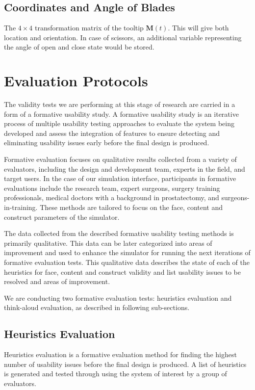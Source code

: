 \subsection{Coordinates and Angle of Blades}\label{para:data_coordinates_of_blades}

The $4\times 4$ transformation matrix of the tooltip $\mathbf{M}(t)$. This will give both location and orientation. In case of scissors, an additional variable representing the angle of open and close state would be stored.

\section{Evaluation Protocols}\label{sec:evaluation}

The validity tests we are performing at this stage of research are carried in a form of a formative usability study. A formative usability study is an iterative process of multiple usability testing approaches to evaluate the system being developed and assess the integration of features to ensure detecting and eliminating usability issues early before the final design is produced.

Formative evaluation focuses on qualitative results collected from a variety of evaluators, including the design and development team, experts in the field, and target users. In the case of our simulation interface, participants in formative evaluations include the research team, expert surgeons, surgery training professionals, medical doctors with a background in prostatectomy, and surgeons-in-training. These methods are tailored to focus on the face, content and construct parameters of the simulator.

The data collected from the described formative usability testing methods is primarily qualitative.  This data can be later categorized into areas of improvement and used to enhance the simulator for running the next iterations of formative evaluation tests. This qualitative data describes the state of each of the heuristics for face, content and construct validity and list usability issues to be resolved and areas of improvement.

We are conducting two formative evaluation tests: heuristics evaluation and think-aloud evaluation, as described in following sub-sections.

\subsection{Heuristics Evaluation}
Heuristics evaluation is a formative evaluation method for finding the highest number of usability issues before the final design is produced. A list of heuristics is generated and tested through using the system of interest by a group of evaluators.

